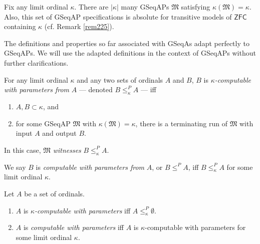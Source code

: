 \documentclass[12pt]{article}
\numberwithin{equation}{section}
\begin{document}
\begin{rem}\label{rem248}
Fix any limit ordinal $\kappa$. There are $|\kappa|$ many GSeqAPs $\mathfrak{M}$ satisfying $\kappa(\mathfrak{M}) = \kappa$. Also, this set of GSeqAP specifications is absolute for transitive models of $\mathsf{ZFC}$ containing $\kappa$ (cf. Remark \ref{rem225}).
\end{rem}

The definitions and properties so far associated with GSeqAs adapt perfectly to GSeqAPs. We will use the adapted definitions in the context of GSeqAPs without further clarifications.

\begin{defi}\label{def38}
For any limit ordinal $\kappa$ and any two sets of ordinals $A$ and $B$, $B$ is $\kappa$\emph{-computable with parameters from} $A$ --- denoted $B \leq^P_{\kappa} A$ --- iff 
\begin{enumerate}[label=(\alph*)]
    \item $A, B \subset \kappa$, and
    \item for some GSeqAP $\mathfrak{M}$ with $\kappa(\mathfrak{M}) = \kappa$, there is a terminating run of $\mathfrak{M}$ with input $A$ and output $B$. 
\end{enumerate}
In this case, $\mathfrak{M}$ \emph{witnesses} $B \leq^P_{\kappa} A$.
\end{defi}

\begin{defi}\label{def839}
We say $B$ is \emph{computable with parameters from} $A$, or $B \leq^P A$, iff $B \leq^P_{\kappa} A$ for some limit ordinal $\kappa$.
\end{defi}

\begin{defi}
Let $A$ be a set of ordinals.
\begin{enumerate}[label=(\arabic*)]
    \item $A$ is $\kappa$\emph{-computable with parameters} iff $A \leq^P_{\kappa} \emptyset$.
    \item $A$ is \emph{computable with parameters} iff $A$ is $\kappa$-computable with parameters for some limit ordinal $\kappa$.
\end{enumerate}
\end{defi}
\end{document}
